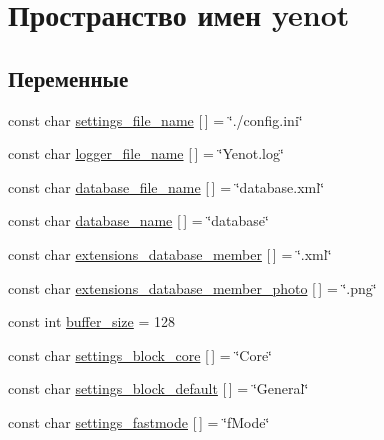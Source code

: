 \hypertarget{namespaceyenot}{}\section{Пространство имен yenot}
\label{namespaceyenot}
\subsection*{Переменные}
\begin{DoxyCompactItemize}
\item 
const char \mbox{\hyperlink{namespaceyenot_adc33110d5c91abdee044c45cd5c725b1}{settings\+\_\+file\+\_\+name}} \mbox{[}$\,$\mbox{]} = \char`\"{}./config.\+ini\char`\"{}
\item 
const char \mbox{\hyperlink{namespaceyenot_ab82af39640477c63378716f6699d49fe}{logger\+\_\+file\+\_\+name}} \mbox{[}$\,$\mbox{]} = \char`\"{}Yenot.\+log\char`\"{}
\item 
const char \mbox{\hyperlink{namespaceyenot_ac18180ab326731ce58145fe9049c49b9}{database\+\_\+file\+\_\+name}} \mbox{[}$\,$\mbox{]} = \char`\"{}database.\+xml\char`\"{}
\item 
const char \mbox{\hyperlink{namespaceyenot_a5c402b62f742f34e9e42756075df6ed2}{database\+\_\+name}} \mbox{[}$\,$\mbox{]} = \char`\"{}database\char`\"{}
\item 
const char \mbox{\hyperlink{namespaceyenot_a33ac96c1605ea0acb1f29aaf1ace51da}{extensions\+\_\+database\+\_\+member}} \mbox{[}$\,$\mbox{]} = \char`\"{}.xml\char`\"{}
\item 
const char \mbox{\hyperlink{namespaceyenot_aad9119112273f919a9be40dd3cd6f883}{extensions\+\_\+database\+\_\+member\+\_\+photo}} \mbox{[}$\,$\mbox{]} = \char`\"{}.png\char`\"{}
\item 
const int \mbox{\hyperlink{namespaceyenot_adc382d9413986f36649df4f983cf1ebe}{buffer\+\_\+size}} = 128
\item 
const char \mbox{\hyperlink{namespaceyenot_a2640b6ef7faaea51fd49edfd377c62a5}{settings\+\_\+block\+\_\+core}} \mbox{[}$\,$\mbox{]} = \char`\"{}Core\char`\"{}
\item 
const char \mbox{\hyperlink{namespaceyenot_a2c183b5b1119e19804dce22eaad06010}{settings\+\_\+block\+\_\+default}} \mbox{[}$\,$\mbox{]} = \char`\"{}General\char`\"{}
\item 
const char \mbox{\hyperlink{namespaceyenot_a49273bc3609e4a1d9c1a3e4a5cfcdafd}{settings\+\_\+fastmode}} \mbox{[}$\,$\mbox{]} = \char`\"{}f\+Mode\char`\"{}
\item 

\end{DoxyCompactItemize}

